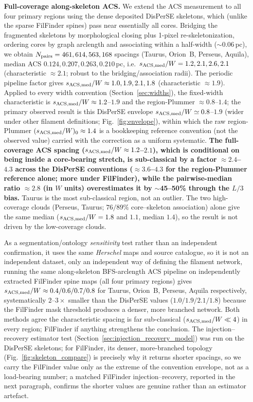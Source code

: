\documentclass[usenatbib,twoside,twocolumn]{mnras}
\begin{document}
\textbf{Full-coverage along-skeleton ACS.} We extend the ACS measurement to all four primary regions using the dense deposited DisPerSE skeletons, which (unlike the sparse FilFinder spines) pass near essentially all cores. Bridging the fragmented skeletons by morphological closing plus 1-pixel re-skeletonization, ordering cores by graph arclength and associating within a half-width ($\sim$0.06\,pc), we obtain $N_{\rm pairs}=461,614,563,168$ spacings (Taurus, Orion~B, Perseus, Aquila), median ACS $0.124,0.207,0.263,0.210$\,pc, i.e.\ $s_{\rm ACS,med}/W=1.2,2.1,2.6,2.1$ (characteristic $\approx2.1$; robust to the bridging/association radii). The periodic pipeline factor gives $s_{\rm ACS,med}/W\approx1.0,1.9,2.1,1.8$ (characteristic $\approx1.9$). Applied to every width convention (Section~\ref{sec:widths}), the fixed-width characteristic is $s_{\rm ACS,med}/W\approx1.2$--$1.9$ and the region-Plummer $\approx0.8$--$1.4$; the primary observed result is this DisPerSE envelope $s_{\rm ACS,med}/W\simeq0.8$--$1.9$ (wider under other filament definitions; Fig.~\ref{fig:envelope}), within which the raw region-Plummer $(s_{\rm ACS,med}/W)_0\approx1.4$ is a bookkeeping reference convention (not the observed value) carried with the correction as a uniform systematic. \textbf{The full-coverage ACS spacing ($s_{\rm ACS,med}/W\approx1.2$--$2.1$), which is conditional on being inside a core-bearing stretch, is sub-classical by a factor $\approx2.4$--$4.3$ across the DisPerSE conventions ($\approx3.6$--$4.3$ for the region-Plummer reference alone; more under FilFinder), while the pairwise-median ratio $\approx2.8$ (in $W$ units) overestimates it by $\sim$45--50\% through the $L/3$ bias.} Taurus is the most sub-classical region, not an outlier. The two high-coverage clouds (Perseus, Taurus; $76/89\%$ core--skeleton association) alone give the same median ($s_{\rm ACS,med}/W=1.8$ and $1.1$, median $1.4$), so the result is not driven by the low-coverage clouds.

As a segmentation/ontology \emph{sensitivity} test rather than an independent confirmation, it uses the same \textit{Herschel} maps and source catalogue, so it is not an independent dataset, only an independent way of defining the filament network, running the same along-skeleton BFS-arclength ACS pipeline on independently extracted FilFinder spine maps (all four primary regions) gives $s_{\rm ACS,med}/W\approx0.4/0.6/0.7/0.8$ for Taurus, Orion~B, Perseus, Aquila respectively, systematically $2$--$3\times$ smaller than the DisPerSE values ($1.0/1.9/2.1/1.8$) because the FilFinder mask threshold produces a denser, more branched network. Both methods agree the characteristic spacing is far sub-classical ($s_{\rm ACS,med}/W\ll4$) in every region; FilFinder if anything strengthens the conclusion. The injection--recovery estimator test (Section~\ref{sec:injection_recovery_model}) was run on the DisPerSE skeletons; for FilFinder, its denser, more-branched topology (Fig.~\ref{fig:skeleton_compare}) is precisely why it returns shorter spacings, so we carry the FilFinder value only as the extreme of the convention envelope, not as a load-bearing number; a matched FilFinder injection--recovery, reported in the next paragraph, confirms the shorter values are genuine rather than an estimator artefact.
\end{document}
